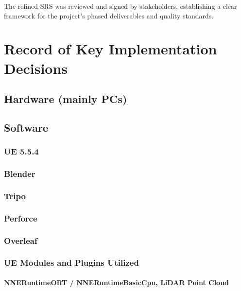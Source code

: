 \documentclass[12pt,a4paper]{report}
\begin{document}
The refined SRS was reviewed and signed by stakeholders, establishing a clear framework for the project's phased deliverables and quality standards.


\chapter{Record of Key Implementation Decisions}

\section{Hardware (mainly PCs)}

\section{Software}

\subsection{UE 5.5.4}

\subsection{Blender}

\subsection{Tripo}

\subsection{Perforce}

\subsection{Overleaf}

\subsection{UE Modules and Plugins Utilized}

\subsubsection{NNERuntimeORT / NNERuntimeBasicCpu, LiDAR Point Cloud}
\end{document}
